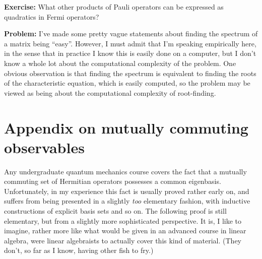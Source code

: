\documentclass[12pt]{article}
\begin{document}
\textbf{Exercise:} What other products of Pauli operators can be
expressed as quadratics in Fermi operators?

\textbf{Problem:} I've made some pretty vague statements about finding
the spectrum of a matrix being ``easy''.  However, I must admit that
I'm speaking empirically here, in the sense that in practice I know
this is easily done on a computer, but I don't know a whole lot about
the computational complexity of the problem.  One obvious observation
is that finding the spectrum is equivalent to finding the roots of the
characteristic equation, which is easily computed, so the problem may
be viewed as being about the computational complexity of root-finding.




\section{Appendix on mutually commuting observables}

Any undergraduate quantum mechanics course covers the fact that a
mutually commuting set of Hermitian operators possesses a common
eigenbasis.  Unfortunately, in my experience this fact is usually
proved rather early on, and suffers from being presented in a slightly
\emph{too} elementary fashion, with inductive constructions of
explicit basis sets and so on.  The following proof is still
elementary, but from a slightly more sophisticated perspective.  It
is, I like to imagine, rather more like what would be given in an
advanced course in linear algebra, were linear algebraists to actually
cover this kind of material.  (They don't, so far as I know, having
other fish to fry.)
\end{document}
